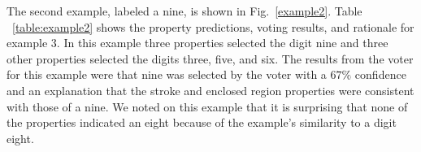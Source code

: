 \documentclass[conference]{IEEEtran}
\begin{document}
The second example,  labeled a nine, is shown in Fig.~\ref{example2}.  Table ~\ref{table:example2} shows the property predictions, voting results, and rationale for example 3.  In this example three properties selected the digit nine and three other properties selected the digits three, five, and six.  The results from the voter for this example were that nine was selected by the voter with a $67\%$ confidence and an explanation that the stroke and enclosed region properties were consistent with those of a nine.  We noted on this example that it is surprising that none of the properties indicated an eight because of the example's similarity to a digit eight.  

\begin{table}[htbp]
\caption{Probabilistic voting and explainability for Example 2}
\centering
{}
\label{table:example2}
\end{table}
\end{document}
